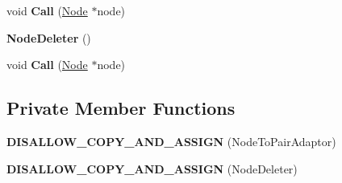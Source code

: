 \begin{DoxyCompactItemize}
\item 
void {\bfseries Call} (\hyperlink{classv8_1_1internal_1_1_splay_tree_1_1_node}{Node} $\ast$node)\hypertarget{classv8_1_1internal_1_1_splay_tree_1_1_b_a_s_e___e_m_b_e_d_d_e_d_a07a0fd21214268a9b1f8bcbce2fd6c22}{}\label{classv8_1_1internal_1_1_splay_tree_1_1_b_a_s_e___e_m_b_e_d_d_e_d_a07a0fd21214268a9b1f8bcbce2fd6c22}

\item 
{\bfseries Node\+Deleter} ()\hypertarget{classv8_1_1internal_1_1_splay_tree_1_1_b_a_s_e___e_m_b_e_d_d_e_d_a4d2a7a81b4f4bb4282a44978855b5b0a}{}\label{classv8_1_1internal_1_1_splay_tree_1_1_b_a_s_e___e_m_b_e_d_d_e_d_a4d2a7a81b4f4bb4282a44978855b5b0a}

\item 
void {\bfseries Call} (\hyperlink{classv8_1_1internal_1_1_splay_tree_1_1_node}{Node} $\ast$node)\hypertarget{classv8_1_1internal_1_1_splay_tree_1_1_b_a_s_e___e_m_b_e_d_d_e_d_a07a0fd21214268a9b1f8bcbce2fd6c22}{}\label{classv8_1_1internal_1_1_splay_tree_1_1_b_a_s_e___e_m_b_e_d_d_e_d_a07a0fd21214268a9b1f8bcbce2fd6c22}

\end{DoxyCompactItemize}
\subsection*{Private Member Functions}
\begin{DoxyCompactItemize}
\item 
{\bfseries D\+I\+S\+A\+L\+L\+O\+W\+\_\+\+C\+O\+P\+Y\+\_\+\+A\+N\+D\+\_\+\+A\+S\+S\+I\+GN} (Node\+To\+Pair\+Adaptor)\hypertarget{classv8_1_1internal_1_1_splay_tree_1_1_b_a_s_e___e_m_b_e_d_d_e_d_ac7d2fad35dabf1b348e4076a4baa217a}{}\label{classv8_1_1internal_1_1_splay_tree_1_1_b_a_s_e___e_m_b_e_d_d_e_d_ac7d2fad35dabf1b348e4076a4baa217a}

\item 
{\bfseries D\+I\+S\+A\+L\+L\+O\+W\+\_\+\+C\+O\+P\+Y\+\_\+\+A\+N\+D\+\_\+\+A\+S\+S\+I\+GN} (Node\+Deleter)\hypertarget{classv8_1_1internal_1_1_splay_tree_1_1_b_a_s_e___e_m_b_e_d_d_e_d_aa5fff11008e8a46e1798944fdf4dd1da}{}\label{classv8_1_1internal_1_1_splay_tree_1_1_b_a_s_e___e_m_b_e_d_d_e_d_aa5fff11008e8a46e1798944fdf4dd1da}

\end{DoxyCompactItemize}
